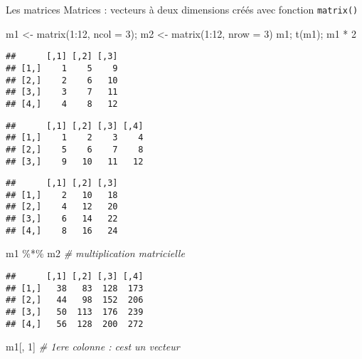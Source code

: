 \documentclass[10pt,xcolor=table,color={dvipsnames,usenames},ignorenonframetext,usepdftitle=false,french]{beamer}
\newenvironment{Shaded}{\begin{snugshade}}{\end{snugshade}}
\newcommand{\AttributeTok}[1]{\textcolor[rgb]{0.77,0.63,0.00}{#1}}
\newcommand{\CommentTok}[1]{\textcolor[rgb]{0.56,0.35,0.01}{\textit{#1}}}
\newcommand{\DecValTok}[1]{\textcolor[rgb]{0.00,0.00,0.81}{#1}}
\newcommand{\FunctionTok}[1]{\textcolor[rgb]{0.00,0.00,0.00}{#1}}
\newcommand{\NormalTok}[1]{#1}
\newcommand{\OtherTok}[1]{\textcolor[rgb]{0.56,0.35,0.01}{#1}}
\newcommand{\SpecialCharTok}[1]{\textcolor[rgb]{0.00,0.00,0.00}{#1}}
\begin{document}
\begin{frame}{Les matrices}
\protect\hypertarget{les-matrices-1}{}
Matrices : vecteurs à deux dimensions créés avec fonction
\texttt{matrix()}

\begin{Shaded}
\begin{Highlighting}[]
\NormalTok{m1 }\OtherTok{\textless{}{-}} \FunctionTok{matrix}\NormalTok{(}\DecValTok{1}\SpecialCharTok{:}\DecValTok{12}\NormalTok{, }\AttributeTok{ncol =} \DecValTok{3}\NormalTok{); m2 }\OtherTok{\textless{}{-}} \FunctionTok{matrix}\NormalTok{(}\DecValTok{1}\SpecialCharTok{:}\DecValTok{12}\NormalTok{, }\AttributeTok{nrow =} \DecValTok{3}\NormalTok{)}
\NormalTok{m1; }\FunctionTok{t}\NormalTok{(m1); m1 }\SpecialCharTok{*} \DecValTok{2}
\end{Highlighting}
\end{Shaded}

\begin{verbatim}
##      [,1] [,2] [,3]
## [1,]    1    5    9
## [2,]    2    6   10
## [3,]    3    7   11
## [4,]    4    8   12
\end{verbatim}

\begin{verbatim}
##      [,1] [,2] [,3] [,4]
## [1,]    1    2    3    4
## [2,]    5    6    7    8
## [3,]    9   10   11   12
\end{verbatim}

\begin{verbatim}
##      [,1] [,2] [,3]
## [1,]    2   10   18
## [2,]    4   12   20
## [3,]    6   14   22
## [4,]    8   16   24
\end{verbatim}

\begin{Shaded}
\begin{Highlighting}[]
\NormalTok{m1 }\SpecialCharTok{\%*\%}\NormalTok{ m2 }\CommentTok{\# multiplication matricielle}
\end{Highlighting}
\end{Shaded}

\begin{verbatim}
##      [,1] [,2] [,3] [,4]
## [1,]   38   83  128  173
## [2,]   44   98  152  206
## [3,]   50  113  176  239
## [4,]   56  128  200  272
\end{verbatim}

\begin{Shaded}
\begin{Highlighting}[]
\NormalTok{m1[, }\DecValTok{1}\NormalTok{] }\CommentTok{\# 1ere colonne : c\textquotesingle{}est un vecteur}
\end{Highlighting}
\end{Shaded}


\end{frame}
\end{document}
